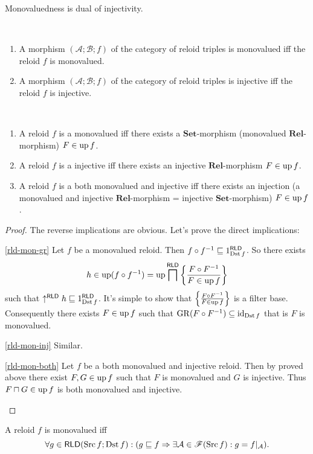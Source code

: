 Monovaluedness is dual of injectivity.
\begin{obvious}
~
\begin{enumerate}
\item A morphism $(\mathcal{A};\mathcal{B};f)$ of the category of reloid
triples is monovalued iff the reloid $f$ is monovalued.
\item A morphism $(\mathcal{A};\mathcal{B};f)$ of the category of reloid
triples is injective iff the reloid $f$ is injective.
\end{enumerate}
\end{obvious}
\begin{thm}
~
\begin{enumerate}
\item \label{rld-mon-gr}A reloid $f$ is a monovalued iff there exists
a $\mathbf{Set}$-morphism (monovalued $\mathbf{Rel}$-morphism) $F\in\operatorname{up} f$.
\item \label{rld-mon-inj}A reloid $f$ is a injective iff there exists
an injective $\mathbf{Rel}$-morphism $F\in\operatorname{up} f$.
\item \label{rld-mon-both}A reloid $f$ is a both monovalued and injective
iff there exists an injection (a monovalued and injective $\mathbf{Rel}$-morphism
= injective $\mathbf{Set}$-morphism) $F\in\operatorname{up} f$.
\end{enumerate}
\end{thm}
\begin{proof}
The reverse implications are obvious. Let's prove the direct implications:
\begin{widedisorder}
\item [{\ref{rld-mon-gr}}] Let $f$ be a monovalued reloid. Then $f\circ f^{-1}\sqsubseteq1_{\operatorname{Dst} f}^{\mathsf{RLD}}$.
So there exists
\[
h\in\operatorname{up}(f\circ f^{-1})=\operatorname{up}\bigsqcap^{\mathsf{RLD}}\left\{ \frac{F\circ F^{-1}}{F\in\operatorname{up} f}\right\}
\]
such that $\uparrow^{\mathsf{RLD}}h\sqsubseteq1_{\operatorname{Dst} f}^{\mathsf{RLD}}$.
It's simple to show that $\left\{ \frac{F\circ F^{-1}}{F\in\operatorname{up} f}\right\}$ is
a filter base. Consequently there exists $F\in\operatorname{up} f$ such that $\operatorname{GR}(F\circ F^{-1})\subseteq\operatorname{id}_{\operatorname{Dst} f}$
that is $F$ is monovalued.
\item [{\ref{rld-mon-inj}}] Similar.
\item [{\ref{rld-mon-both}}] Let $f$ be a both monovalued and injective
reloid. Then by proved above there exist $F,G\in\operatorname{up} f$ such that
$F$ is monovalued and $G$ is injective. Thus $F\sqcap G\in\operatorname{up} f$
is both monovalued and injective.
\end{widedisorder}
\end{proof}
\begin{conjecture}
A reloid $f$ is monovalued iff
\[
\forall g\in\mathsf{\mathsf{RLD}}(\operatorname{Src} f;\operatorname{Dst} f):(g\sqsubseteq f\Rightarrow\exists\mathcal{A}\in\mathscr{F}(\operatorname{Src} f):g=f|_{\mathcal{A}}).
\]

\end{conjecture}

